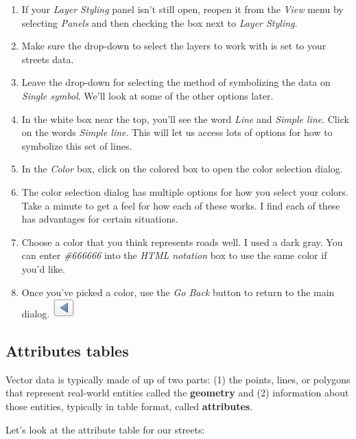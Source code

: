 \documentclass[
]{article}
\providecommand{\tightlist}{%
  \setlength{\itemsep}{0pt}\setlength{\parskip}{0pt}}
\begin{document}
\begin{enumerate}
\def\labelenumi{\arabic{enumi}.}
\tightlist
\item
  If your \emph{Layer Styling} panel isn't still open, reopen it from the \emph{View} menu by selecting \emph{Panels} and then checking the box next to \emph{Layer Styling}.
\item
  Make sure the drop-down to select the layers to work with is set to your streets data.
\item
  Leave the drop-down for selecting the method of symbolizing the data on \emph{Single symbol}. We'll look at some of the other options later.
\item
  In the white box near the top, you'll see the word \emph{Line} and \emph{Simple line}. Click on the words \emph{Simple line}. This will let us access lots of options for how to symbolize this set of lines.
\item
  In the \emph{Color} box, click on the colored box to open the color selection dialog.
\item
  The color selection dialog has multiple options for how you select your colors. Take a minute to get a feel for how each of these works. I find each of these has advantages for certain situations.
\item
  Choose a color that you think represents roads well. I used a dark gray. You can enter \emph{\#666666} into the \emph{HTML notation} box to use the same color if you'd like.\\
\item
  Once you've picked a color, use the \emph{Go Back} button to return to the main dialog. \includegraphics{./images/Tool_GoBack.PNG}
\end{enumerate}

\hypertarget{attributes-tables}{%
\subsection{Attributes tables}\label{attributes-tables}}

Vector data is typically made of up of two parts: (1) the points, lines, or polygons that represent real-world entities called the \textbf{geometry} and (2) information about those entities, typically in table format, called \textbf{attributes}.

Let's look at the attribute table for our streets:
\end{document}
